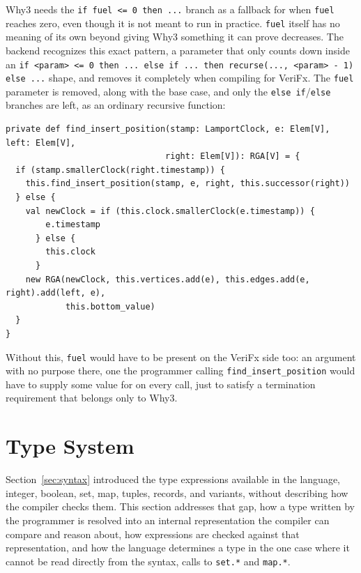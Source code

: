Why3 needs the \texttt{if fuel <= 0 then ...} branch as a fallback for when \texttt{fuel} reaches zero, even though it
is not meant to run in practice. \texttt{fuel} itself has no meaning of its own beyond giving Why3 something it can prove
decreases. The backend recognizes this exact pattern, a parameter that only counts down inside an \texttt{if <param> <= 0
then ... else if ... then recurse(..., <param> - 1) else ...} shape, and removes it completely when compiling for VeriFx.
The \texttt{fuel} parameter is removed, along with the base case, and only the \texttt{else if}/\texttt{else} branches are
left, as an ordinary recursive function:

\begin{lstlisting}[caption={\texttt{find\_insert\_position}, as generated for VeriFx}, label={lst:find-insert}]
private def find_insert_position(stamp: LamportClock, e: Elem[V], left: Elem[V],
                                right: Elem[V]): RGA[V] = {
  if (stamp.smallerClock(right.timestamp)) {
    this.find_insert_position(stamp, e, right, this.successor(right))
  } else {
    val newClock = if (this.clock.smallerClock(e.timestamp)) {
        e.timestamp
      } else {
        this.clock
      }
    new RGA(newClock, this.vertices.add(e), this.edges.add(e, right).add(left, e),
            this.bottom_value)
  }
}
\end{lstlisting}

Without this, \texttt{fuel} would have to be present on the VeriFx side too: an argument with no purpose there, one the
programmer calling \texttt{find\_insert\_position} would have to supply some value for on every call, just to satisfy a
termination requirement that belongs only to Why3.

\section{Type System}
\label{sec:language-types}

Section~\ref{sec:syntax} introduced the type expressions available in the language, integer, boolean, set, map, tuples, records, and
variants, without describing how the compiler checks them. This section addresses that gap, how a type written by the
programmer is resolved into an internal representation the compiler can compare and reason about, how expressions are
checked against that representation, and how the language determines a type in the one case where it cannot be read
directly from the syntax, calls to \texttt{set.*} and \texttt{map.*}.

